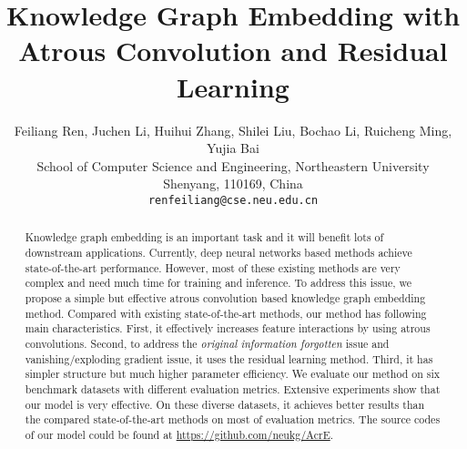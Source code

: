 \documentclass[11pt]{article}
\title{Knowledge Graph Embedding with Atrous Convolution and  Residual Learning}
\author{Feiliang Ren, Juchen Li, Huihui Zhang, Shilei Liu, Bochao Li, Ruicheng Ming, Yujia Bai \\
  School of Computer Science and Engineering, Northeastern University \\
    Shenyang,   110169, China\\
  {\tt renfeiliang@cse.neu.edu.cn} \\
}
\date{}
\begin{document}
\maketitle
\begin{abstract}
Knowledge graph embedding is an important task and it will benefit lots of downstream applications. Currently, deep neural networks  based methods achieve state-of-the-art performance. However, most of these existing methods  are very  complex and need much time for training and inference. To address this issue, we propose a simple but effective atrous convolution based knowledge graph embedding method. Compared with  existing state-of-the-art methods, our method has following main characteristics. First, it effectively increases feature interactions by using atrous convolutions. Second, to address the \emph{original information forgotten} issue and vanishing/exploding gradient issue, it uses the residual learning method. Third, it has simpler structure but much higher parameter efficiency.  We evaluate our method on six benchmark datasets with different evaluation metrics. Extensive experiments show that our model is very effective. On these diverse datasets, it achieves better results than the compared state-of-the-art methods on most of evaluation metrics. The source codes of our model could be found at \url{https://github.com/neukg/AcrE}. \end{abstract}
\end{document}
